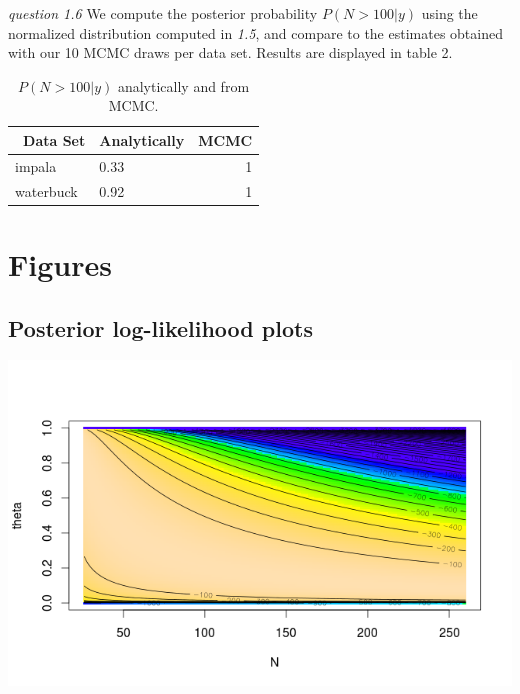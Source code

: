 \documentclass[twoside]{article}
\begin{document}
\textit{question 1.6} We compute the posterior probability $P(N > 100 | y)$ using the normalized distribution computed in \textit{1.5}, and compare to the estimates obtained with our 10 MCMC draws per data set. Results are displayed in table 2.

\begin{table}[H]
\caption{$P(N > 100 | y)$ analytically and from MCMC.}
\centering
\begin{tabular}{llr}
\toprule\
Data Set & Analytically & MCMC \\
\midrule
impala & 0.33 & 1 \\
waterbuck & 0.92 & 1\\
\bottomrule
\end{tabular}
\end{table}

\newpage
\appendix
\section{Figures}

\subsection{Posterior log-likelihood plots}

\begingroup
\centering
\includegraphics[scale=0.55]{./img/imp_logpost.png}
\endgroup
\end{document}
